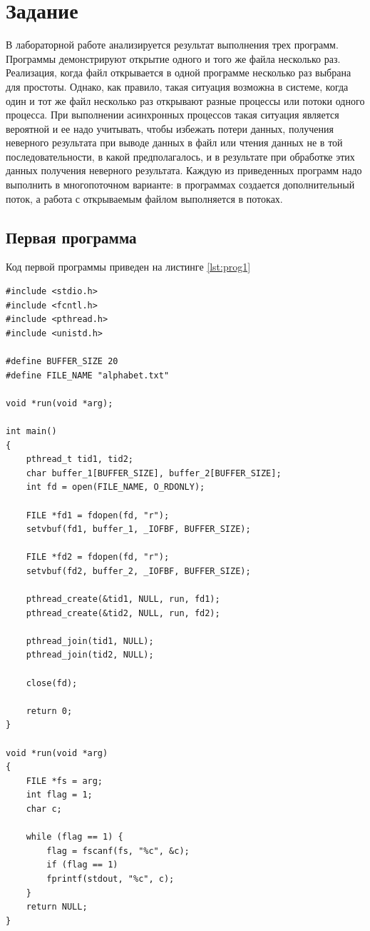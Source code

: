 \chapter{Задание}
В лабораторной работе анализируется результат выполнения трех программ. Программы демонстрируют открытие одного и того же файла несколько раз. Реализация, когда файл открывается в одной программе несколько раз выбрана для простоты. Однако, как правило, такая ситуация возможна в системе, когда один и тот же файл несколько раз открывают разные процессы или потоки одного процесса. При выполнении асинхронных процессов такая ситуация является вероятной и ее надо учитывать, чтобы избежать потери данных, получения
неверного результата при выводе данных в файл или чтения данных не в той
последовательности, в какой предполагалось, и в результате при обработке этих данных получения неверного результата. Каждую из приведенных программ надо выполнить в многопоточном варианте: в программах создается дополнительный поток, а работа с открываемым файлом выполняется в потоках.

\section{Первая программа}
Код первой программы приведен на листинге \ref{lst:prog1}
\begin{lstlisting}[label=lst:prog1, caption=Код программы 1, basicstyle=\footnotesize]
#include <stdio.h>
#include <fcntl.h>
#include <pthread.h>
#include <unistd.h>

#define BUFFER_SIZE 20
#define FILE_NAME "alphabet.txt"

void *run(void *arg);

int main()
{
	pthread_t tid1, tid2;
	char buffer_1[BUFFER_SIZE], buffer_2[BUFFER_SIZE];
	int fd = open(FILE_NAME, O_RDONLY);
	
	FILE *fd1 = fdopen(fd, "r");
	setvbuf(fd1, buffer_1, _IOFBF, BUFFER_SIZE);
	
	FILE *fd2 = fdopen(fd, "r");
	setvbuf(fd2, buffer_2, _IOFBF, BUFFER_SIZE);
	
	pthread_create(&tid1, NULL, run, fd1);
	pthread_create(&tid2, NULL, run, fd2);
	
	pthread_join(tid1, NULL);
	pthread_join(tid2, NULL);
	
	close(fd);
	
	return 0;
}

void *run(void *arg)
{
	FILE *fs = arg;
	int flag = 1;
	char c;
	
	while (flag == 1) {
		flag = fscanf(fs, "%c", &c);
		if (flag == 1)
		fprintf(stdout, "%c", c);
	}
	return NULL;
}	
\end{lstlisting}

